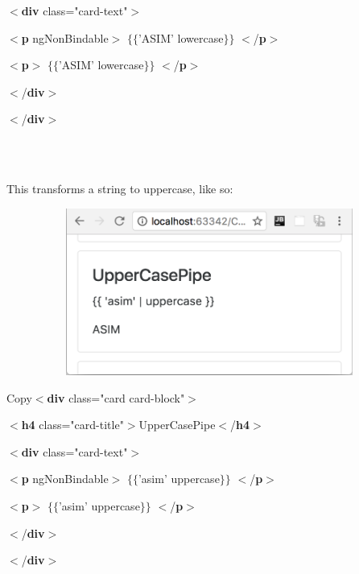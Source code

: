 \documentclass{article}
\begin{document}
$\mathrm{<}$\textbf{div} class="card-text"$\mathrm{>}$

$\mathrm{<}$\textbf{p} ngNonBindable$\mathrm{>}$ $\mathrm{\{}$$\mathrm{\{}$'ASIM' {\textbar} lowercase$\mathrm{\}}$$\mathrm{\}}$ $\mathrm{<}$/\textbf{p}$\mathrm{>}$

$\mathrm{<}$\textbf{p}$\mathrm{>}$ $\mathrm{\{}$$\mathrm{\{}$'ASIM' {\textbar} lowercase$\mathrm{\}}$$\mathrm{\}}$ $\mathrm{<}$/\textbf{p}$\mathrm{>}$

$\mathrm{<}$/\textbf{div}$\mathrm{>}$

\noindent $\mathrm{<}$/\textbf{div}$\mathrm{>}$

\noindent 

\noindent 
\\ \\
\newpage
{}

\noindent This transforms a string to uppercase, like so: \\

\noindent 

\noindent \includegraphics*[width=5.25in, height=2.16in]{IMG-03-06}

\noindent  Copy$\mathrm{<}$\textbf{div} class="card card-block"$\mathrm{>}$

$\mathrm{<}$\textbf{h4} class="card-title"$\mathrm{>}$UpperCasePipe$\mathrm{<}$/\textbf{h4}$\mathrm{>}$

$\mathrm{<}$\textbf{div} class="card-text"$\mathrm{>}$

$\mathrm{<}$\textbf{p} ngNonBindable$\mathrm{>}$ $\mathrm{\{}$$\mathrm{\{}$'asim' {\textbar} uppercase$\mathrm{\}}$$\mathrm{\}}$ $\mathrm{<}$/\textbf{p}$\mathrm{>}$

$\mathrm{<}$\textbf{p}$\mathrm{>}$ $\mathrm{\{}$$\mathrm{\{}$'asim' {\textbar} uppercase$\mathrm{\}}$$\mathrm{\}}$ $\mathrm{<}$/\textbf{p}$\mathrm{>}$

$\mathrm{<}$/\textbf{div}$\mathrm{>}$

\noindent $\mathrm{<}$/\textbf{div}$\mathrm{>}$
\end{document}

